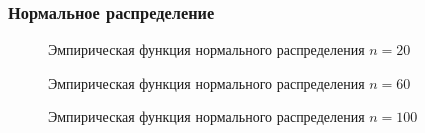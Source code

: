 \documentclass{article}
\begin{document}
\subsubsection{Нормальное распределение}

\begin{figure}[h]
\caption{Эмпирическая функция нормального распределения $n=20$}
\end{figure}

\begin{figure}[h]
\caption{Эмпирическая функция нормального распределения $n=60$}
\end{figure}

\begin{figure}[h]
\caption{Эмпирическая функция нормального распределения $n=100$}
\end{figure}
\end{document}
